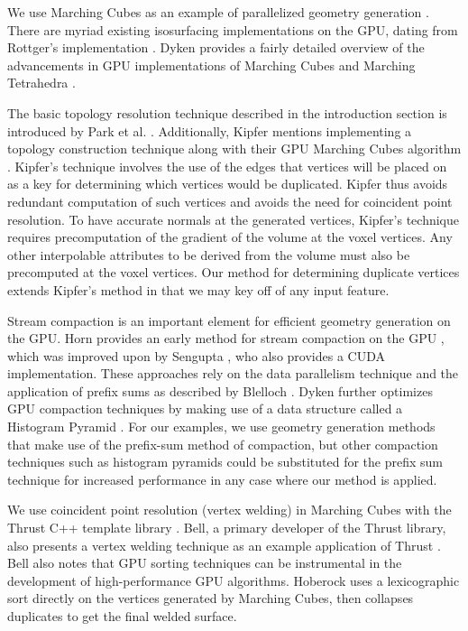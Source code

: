 \documentclass[10pt,journal,cspaper,compsoc]{IEEEtran}
\begin{document}
We use Marching Cubes as an example of parallelized geometry 
generation \cite{Lorensen1987}. There are myriad existing isosurfacing implementations on the GPU, dating from 
Rottger's implementation \cite{Rottger2000}. Dyken provides a fairly 
detailed overview of the advancements in GPU implementations of Marching Cubes and 
Marching Tetrahedra \cite{Dyken2008} .

The basic topology resolution technique described in the introduction section is
introduced by Park et al. \cite{Park}. Additionally, Kipfer mentions
implementing a topology construction technique along with their GPU
Marching Cubes algorithm \cite{Kipfer2005}. Kipfer's technique involves the use of the edges that vertices 
will be placed on as a key for determining which vertices would be duplicated. Kipfer 
thus avoids redundant computation of such vertices and avoids the need for coincident 
point resolution. To have accurate normals at the generated vertices, Kipfer's technique
requires precomputation of the gradient of the volume at the voxel vertices. Any other
interpolable attributes to be derived from the volume must also be precomputed at the
voxel vertices. Our method for determining duplicate vertices extends Kipfer's method in that
we may key off of any input feature.

Stream compaction is an important element for efficient geometry generation on the GPU.
Horn provides an early method for stream compaction on the GPU \cite{Horn2005}, which
was improved upon by Sengupta \cite{Sengupta2007}, who also provides a CUDA implementation. 
These approaches rely on the data parallelism technique and the application of prefix sums 
as described by Blelloch \cite{Blelloch1990}. Dyken further optimizes
GPU compaction techniques by making use of a data structure called a Histogram Pyramid \cite{Dyken2008}.
For our examples, we use geometry generation methods that make use of the prefix-sum
method of compaction, but other compaction techniques such as histogram pyramids could be
substituted for the prefix sum technique for increased performance in any case where our method is applied.

We use coincident point resolution (vertex welding) in Marching Cubes with the Thrust
C++ template library \cite{Bell2012}. Bell, a primary
developer of the Thrust library, also presents a vertex welding technique as an
example application of Thrust \cite{Bell2010}. Bell also notes that GPU sorting techniques can
be instrumental in the development of high-performance GPU algorithms. Hoberock uses a
lexicographic sort directly on the vertices generated by Marching Cubes, then collapses 
duplicates to get the final welded surface.
\end{document}
